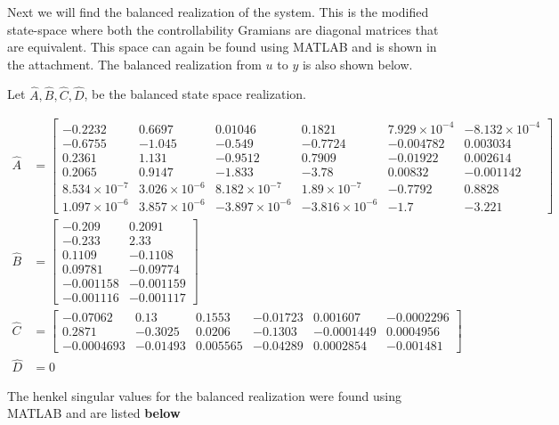 \documentclass{article}
\begin{document}
    Next we will find the balanced realization of the system.
    This is the modified state-space where both the controllability Gramians are diagonal matrices that are equivalent.
    This space can again be found using MATLAB and is shown in the attachment.
    The balanced realization from $u$ to $y$ is also shown below.

    Let $\hat{A}, \hat{B}, \hat{C}, \hat{D}$, be the balanced state space realization.

    \begin{align}
        \hat{A} &= \begin{bmatrix} -0.2232 & 0.6697 & 0.01046 & 0.1821 & 7.929 \times 10^{-4} & -8.132 \times 10^{-4} \\
            -0.6755 & -1.045 & -0.549 & -0.7724 & -0.004782 & 0.003034 \\
            0.2361 & 1.131 & -0.9512 & 0.7909 & -0.01922 & 0.002614 \\
            0.2065 & 0.9147 & -1.833 & -3.78 & 0.00832 & -0.001142 \\
            8.534 \times 10^{-7} & 3.026 \times 10^{-6} & 8.182 \times 10^{-7} & 1.89 \times 10^{-7} & -0.7792 & 0.8828 \\
            1.097 \times 10^{-6} & 3.857 \times 10^{-6} & -3.897 \times 10^{-6} & -3.816 \times 10^{-6} & -1.7 & -3.221 \end{bmatrix}\\
        \hat{B} &= \begin{bmatrix} -0.209 & 0.2091 \\ -0.233 & 2.33 \\ 0.1109 & -0.1108 \\ 0.09781 & -0.09774 \\ -0.001158 & -0.001159 \\ -0.001116 & -0.001117 \end{bmatrix}\\
        \hat{C} &= \begin{bmatrix} -0.07062 & 0.13 & 0.1553 & -0.01723 & 0.001607 & -0.0002296 \\
            0.2871 & -0.3025 & 0.0206 & -0.1303 & -0.0001449 & 0.0004956 \\
            -0.0004693 & -0.01493 & 0.005565 & -0.04289 & 0.0002854 & -0.001481 \end{bmatrix}\\
        \hat{D} &= 0
    \end{align}

    The henkel singular values for the balanced realization were found using MATLAB and are listed \textbf{below}
\end{document}

